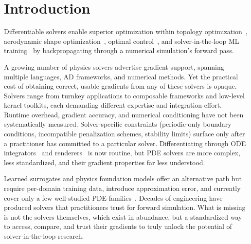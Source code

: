 \documentclass{article}
\begin{document}
\section{Introduction}
\label{sec:intro}


Differentiable solvers enable superior optimization within topology
optimization~\cite{bendsoe2003topology}, aerodynamic shape
optimization~\cite{jameson1988aerodynamic}, optimal
control~\cite{bewley2001dns}, and solver-in-the-loop ML
training~\cite{kochkov2021machine, um2020sol} by backpropagating
through a numerical simulation's forward pass.

A growing number of physics solvers advertise gradient support,
spanning multiple languages, AD frameworks, and numerical methods.
Yet the practical cost of obtaining correct, usable gradients from any
of these solvers is opaque. Solvers range from turnkey applications to
composable frameworks and low-level kernel toolkits, each demanding
different expertise and integration effort. Runtime overhead, gradient accuracy, and numerical conditioning
have not been systematically measured. Solver-specific constraints
(periodic-only boundary conditions,
incompatible penalization schemes, stability limits) surface only after
a practitioner has committed to a particular solver. Differentiating through ODE integrators~\cite{chen2018neural,rackauckas2021universal}
and renderers~\cite{kato2020differentiable} is now routine, but PDE
solvers are more complex, less standardized, and their gradient
properties far less understood.

Learned surrogates and physics foundation models offer an alternative
path but require per-domain training data, introduce approximation
error, and currently cover only a few well-studied PDE
families~\cite{pathak2022fourcastnet, bodnar2024aurora}.
Decades of engineering have produced solvers that practitioners
trust for forward simulation. What is missing is not the solvers
themselves, which exist in abundance, but a standardized way to
access, compare, and trust their gradients to truly unlock the potential
of solver-in-the-loop research.
\end{document}

